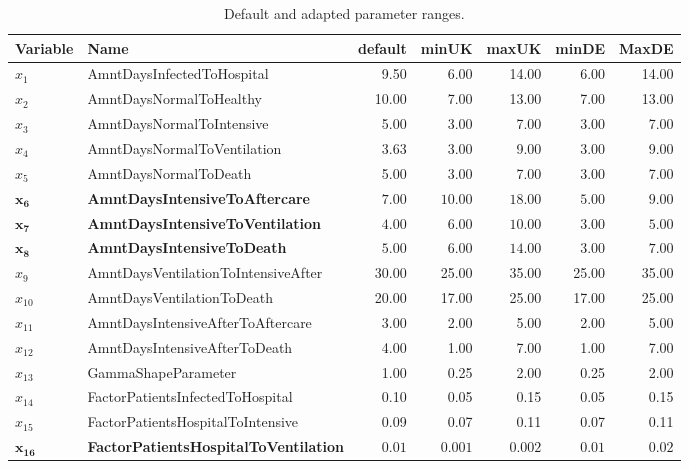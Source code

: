 \documentclass[conference]{IEEEtran}
\begin{document}
\begin{table}[ht]\label{tab:para}
\caption{Default and adapted parameter ranges.}
\centering
\begin{tabular}{llrrrrr}
  \hline
Variable & Name & default & minUK & maxUK & minDE & MaxDE \\ 
  \hline
$x_1$&  AmntDaysInfectedToHospital & 9.50 & 6.00 & 14.00 & 6.00 & 14.00 \\ 
$x_2$&   AmntDaysNormalToHealthy & 10.00 & 7.00 & 13.00 & 7.00 & 13.00 \\ 
$x_3$&   AmntDaysNormalToIntensive & 5.00 & 3.00 & 7.00 & 3.00 & 7.00 \\ 
$x_4$&  AmntDaysNormalToVentilation & 3.63 & 3.00 & 9.00 & 3.00 & 9.00 \\ 
$x_5$&   AmntDaysNormalToDeath & 5.00 & 3.00 & 7.00 & 3.00 & 7.00 \\ 
$ \mathbf{x_6}$&   \textbf{AmntDaysIntensiveToAftercare} & $\mathbf{7.00}$ & $\mathbf{10.00}$ & $\mathbf{18.00}$ & $\mathbf{5.00}$ & $\mathbf{9.00}$ \\ 
$\mathbf{x_7}$ &   \textbf{AmntDaysIntensiveToVentilation} & $\mathbf{4.00}$ & $\mathbf{6.00}$ & $\mathbf{10.00}$ & $\mathbf{3.00}$ & $\mathbf{5.00}$ \\ 
$\mathbf{x_8}$&   \textbf{AmntDaysIntensiveToDeath} & $\mathbf{5.00}$ & $\mathbf{6.00}$ & $\mathbf{14.00}$ & $\mathbf{3.00}$  & $\mathbf{7.00}$ \\ 
$x_9$&   AmntDaysVentilationToIntensiveAfter & 30.00 & 25.00 & 35.00 & 25.00 & 35.00 \\ 
$x_{10}$&   AmntDaysVentilationToDeath & 20.00 & 17.00 & 25.00 & 17.00 & 25.00 \\ 
$x_{11}$&   AmntDaysIntensiveAfterToAftercare & 3.00 & 2.00 & 5.00 & 2.00 & 5.00 \\ 
$x_{12}$&   AmntDaysIntensiveAfterToDeath & 4.00 & 1.00 & 7.00 & 1.00 & 7.00 \\ 
$x_{13}$&   GammaShapeParameter & 1.00 & 0.25 & 2.00 & 0.25 & 2.00 \\ 
$x_{14}$&   FactorPatientsInfectedToHospital & 0.10 & 0.05 & 0.15 & 0.05 & 0.15 \\ 
$x_{15}$&   FactorPatientsHospitalToIntensive & 0.09 & 0.07 & 0.11 & 0.07 & 0.11 \\ 
$ \mathbf{x_{16}}$ & \textbf{FactorPatientsHospitalToVentilation} & $ \mathbf{0.01}$ & $ \mathbf{0.001}$ & $ \mathbf{0.002} $& $ \mathbf{0.01}$ & $ \mathbf{0.02}$ \\ 

\end{tabular}
\end{table}
\end{document}
